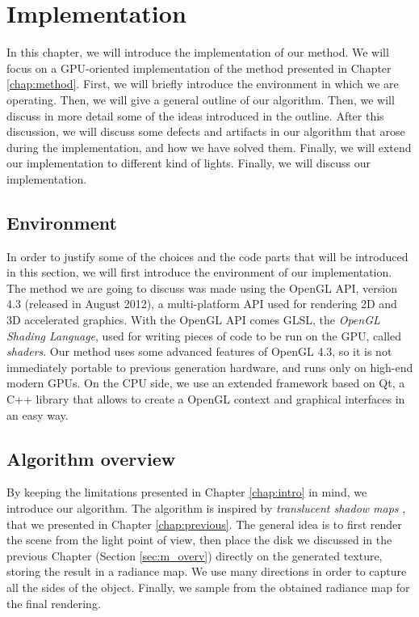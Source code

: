 \chapter{Implementation}
\label{chap:implementation}
In this chapter, we will introduce the implementation of our method. We will focus on a GPU-oriented implementation of the method presented in Chapter \ref{chap:method}. First, we will briefly introduce the environment in which we are operating. Then, we will give a general outline of our algorithm. Then, we will discuss in more detail some of the ideas introduced in the outline. After this discussion, we will discuss some defects and artifacts in our algorithm that arose during the implementation, and how we have solved them. Finally, we will extend our implementation to different kind of lights. Finally, we will discuss our implementation.

\section{Environment}

In order to justify some of the choices and the code parts that will be introduced in this section, we will first introduce the environment of our implementation. The method we are going to discuss was made using the OpenGL API, version 4.3 (released in August 2012), a multi-platform API used for rendering 2D and 3D accelerated graphics. With the OpenGL API comes GLSL, the \emph{OpenGL Shading Language}, used for writing pieces of code to be run on the GPU, called \emph{shaders}. Our method uses some advanced features of OpenGL 4.3, so it is not immediately portable to previous generation hardware, and runs only on high-end modern GPUs. On the CPU side, we use an extended framework based on Qt, a C++ library that allows to create a OpenGL context and graphical interfaces in an easy way.

\section{Algorithm overview}

By keeping the limitations presented in Chapter \ref{chap:intro} in mind, we introduce our algorithm. The algorithm is inspired by \emph{translucent shadow maps} \citep{Dachsbacher:2003:TSM:882404.882433}, that we presented in Chapter \ref{chap:previous}. The general idea is to first render the scene from the light point of view, then place the disk we discussed in the previous Chapter (Section \ref{sec:m_overv}) directly on the generated texture, storing the result in a radiance map. We use many directions in order to capture all the sides of the object. Finally, we sample from the obtained radiance map for the final rendering.

